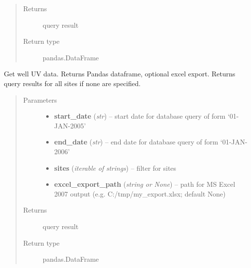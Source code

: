 \documentclass[letterpaper,10pt,english]{sphinxmanual}
\begin{document}
\begin{fulllineitems}
\begin{fulllineitems}
\begin{quote}
\begin{description}
\item[{Returns}] \leavevmode
query result

\item[{Return type}] \leavevmode
pandas.DataFrame

\end{description}\end{quote}

\end{fulllineitems}


\begin{fulllineitems}
\label{modules:webb_utils.retrieve_data.RetrieveData.get_well_uvs}
Get well UV data. Returns Pandas dataframe, optional excel export.
Returns query results for all sites if none are specified.
\begin{quote}\begin{description}
\item[{Parameters}] \leavevmode\begin{itemize}
\item {} 
\textbf{start\_date} (\emph{str}) -- start date for database query of form `01-JAN-2005'

\item {} 
\textbf{end\_date} (\emph{str}) -- end date for database query of form `01-JAN-2006'

\item {} 
\textbf{sites} (\emph{iterable of strings}) -- filter for sites

\item {} 
\textbf{excel\_export\_path} (\emph{string or None}) -- path for MS Excel 2007 output (e.g. C:/tmp/my\_export.xlsx; default None)

\end{itemize}

\item[{Returns}] \leavevmode
query result

\item[{Return type}] \leavevmode
pandas.DataFrame

\end{description}\end{quote}

\end{fulllineitems}


\end{fulllineitems}
\end{document}

